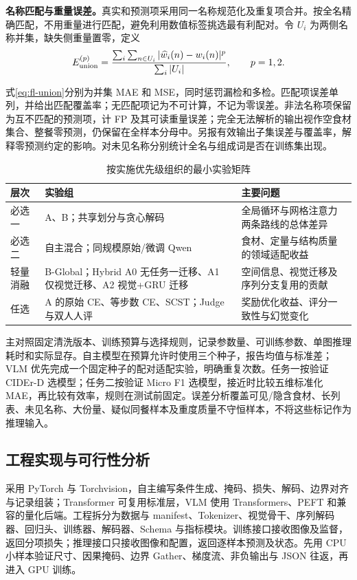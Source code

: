 \textbf{名称匹配与重量误差。}真实和预测项采用同一名称规范化及重复项合并。按全名精确匹配，不用重量进行匹配，避免利用数值标签挑选最有利配对。令 $U_i$ 为两侧名称并集，缺失侧重量置零，定义
\begin{equation}
 E_{\rm union}^{(p)}=\frac{\sum_i\sum_{n\in U_i}|\widehat w_i(n)-w_i(n)|^p}
 {\sum_i|U_i|},\qquad p=1,2.\label{eq:fl-union}
\end{equation}


式\eqref{eq:fl-union}分别为并集 MAE 和 MSE，同时惩罚漏检和多检。匹配项误差单列，并给出匹配覆盖率；无匹配项记为不可计算，不记为零误差。非法名称项保留为互不匹配的预测项，计 FP 及其可读重量误差；完全无法解析的输出视作空食材集合、整餐零预测，仍保留在全样本分母中。另报有效输出子集误差与覆盖率，解释零预测约定的影响。对未见名称分别统计全名与组成词是否在训练集出现。

\begin{table}[!htbp]
\caption{按实施优先级组织的最小实验矩阵}
\label{tab:fl-experiments}\centering\small
\setlength{\tabcolsep}{4pt}\renewcommand{\arraystretch}{1.13}
\begin{tabularx}{\linewidth}{@{}P{1.55cm}P{4.6cm}Y@{}}\toprule
\textbf{层次} & \textbf{实验组} & \textbf{主要问题}\\\midrule
必选一 & A、B；共享划分与贪心解码 & 全局循环与网格注意力两条路线的总体差异\\
必选二 & 自主混合；同规模原始/微调 Qwen & 食材、定量与结构质量的领域适配收益\\
轻量消融 & B-Global；Hybrid A0 无任务一迁移、A1 仅视觉迁移、A2 视觉+GRU 迁移 & 空间信息、视觉迁移及序列分支复用的贡献\\
任选 & A 的原始 CE、等步数 CE、SCST；Judge 与双人人评 & 奖励优化收益、评分一致性与幻觉变化\\\bottomrule
\end{tabularx}
\end{table}

主对照固定清洗版本、训练预算与选择规则，记录参数量、可训练参数、单图推理耗时和实际显存。自主模型在预算允许时使用三个种子，报告均值与标准差；VLM 优先完成一个固定种子的配对适配实验，明确重复次数。任务一按验证 CIDEr-D 选模型；任务二按验证 Micro F1 选模型，接近时比较五维标准化 MAE，再比较有效率，规则在测试前固定。误差分析覆盖可见/隐含食材、长列表、未见名称、大份量、疑似同餐样本及重度质量不守恒样本，不将这些标记作为推理输入。

\subsection{工程实现与可行性分析}
采用 PyTorch 与 Torchvision，自主编写条件生成、掩码、损失、解码、边界对齐与记录组装；Transformer 可复用标准层，VLM 使用 Transformers、PEFT 和兼容的量化后端。工程拆分为数据与 manifest、Tokenizer、视觉骨干、序列解码器、回归头、训练器、解码器、Schema 与指标模块。训练接口接收图像及监督，返回分项损失；推理接口只接收图像和配置，返回逐样本预测及状态。先用 CPU 小样本验证尺寸、因果掩码、边界 Gather、梯度流、非负输出与 JSON 往返，再进入 GPU 训练。

